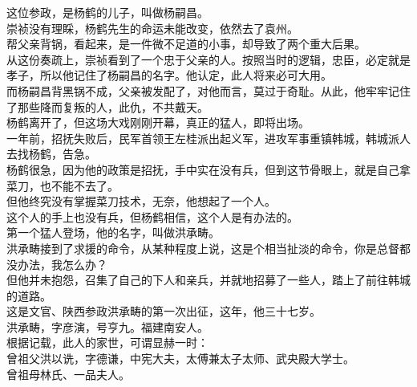 \begin{multicols}{\theparacolNo}
这位参政，是杨鹤的儿子，叫做杨嗣昌。\\

崇祯没有理睬，杨鹤先生的命运未能改变，依然去了袁州。\\

帮父亲背锅，看起来，是一件微不足道的小事，却导致了两个重大后果。\\

从这份奏疏上，崇祯看到了一个忠于父亲的人。按照当时的逻辑，忠臣，必定就是孝子，所以他记住了杨嗣昌的名字。他认定，此人将来必可大用。\\

而杨嗣昌背黑锅不成，父亲被发配了，对他而言，莫过于奇耻。从此，他牢牢记住了那些降而复叛的人，此仇，不共戴天。\\

杨鹤离开了，但这场大戏刚刚开幕，真正的猛人，即将出场。\\

一年前，招抚失败后，民军首领王左桂派出起义军，进攻军事重镇韩城，韩城派人去找杨鹤，告急。\\

杨鹤很急，因为他的政策是招抚，手中实在没有兵，但到这节骨眼上，就是自己拿菜刀，也不能不去了。\\

但他终究没有掌握菜刀技术，无奈，他想起了一个人。\\

这个人的手上也没有兵，但杨鹤相信，这个人是有办法的。\\

第一个猛人登场，他的名字，叫做洪承畴。\\

洪承畴接到了求援的命令，从某种程度上说，这是个相当扯淡的命令，你是总督都没办法，我怎么办？\\

但他并未抱怨，召集了自己的下人和亲兵，并就地招募了一些人，踏上了前往韩城的道路。\\

这是文官、陕西参政洪承畴的第一次出征，这年，他三十七岁。\\

洪承畴，字彦演，号亨九。福建南安人。\\

根据记载，此人的家世，可谓显赫一时：\\

曾祖父洪以诜，字德谦，中宪大夫，太傅兼太子太师、武央殿大学士。\\

曾祖母林氏、一品夫人。\\


\end{multicols}
